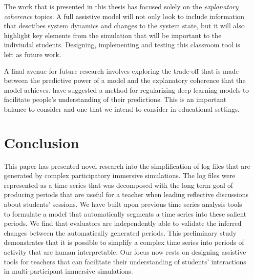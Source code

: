 The work that is presented in this thesis has focused solely on the \textit{explanatory coherence} topics. A full assistive model will not only look to include information that desctibes system dynamics and changes to the system state, but it will also highlight key elements from the simulation that will be important to the indiviudal students. Designing, implementing and testing this classroom tool is left as future work.

A final avenue for future research involves exploring the trade-off that is made between the predictive power of a model and the explanatory coherence that the model achieves. \cite{wu2017beyond} have suggested a method for regularizing deep learning models to facilitate people's understanding of their predictions. This is an important balance to consider and one that we intend to consider in educational settings.

\section{Conclusion}

This paper has presented novel research into the simplification of log files that are generated by complex participatory immersive simulations. The log files were represented as a time series that was decomposed with the long term goal of producing periods that are useful for a teacher when leading reflective discussions about students' sessions. We have built upon previous time series analysis tools to formulate a model that automatically segments a time series into these salient periods. We find that evaluators are independently able to validate the inferred changes between the automatically generated periods. This preliminary study demonstrates that it is possible to simplify a complex time series into periods of activity that are human interpretable.  Our focus now rests on designing assistive tools for teachers that can facilitate their understanding of students' interactions in multi-participant immersive simulations.
